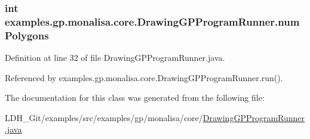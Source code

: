 \hypertarget{classexamples_1_1gp_1_1monalisa_1_1core_1_1_drawing_g_p_program_runner_ae887f8429d8bfd27c586fbb8957ddaad}{
\subsubsection[{num\-Polygons}]{\setlength{\rightskip}{0pt plus 5cm}int examples.\-gp.\-monalisa.\-core.\-Drawing\-G\-P\-Program\-Runner.\-num\-Polygons}}\label{classexamples_1_1gp_1_1monalisa_1_1core_1_1_drawing_g_p_program_runner_ae887f8429d8bfd27c586fbb8957ddaad}


Definition at line 32 of file Drawing\-G\-P\-Program\-Runner.\-java.



Referenced by examples.\-gp.\-monalisa.\-core.\-Drawing\-G\-P\-Program\-Runner.\-run().



The documentation for this class was generated from the following file\-:\begin{DoxyCompactItemize}
\item 
L\-D\-H\-\_\-\-Git/examples/src/examples/gp/monalisa/core/\hyperlink{_drawing_g_p_program_runner_8java}{Drawing\-G\-P\-Program\-Runner.\-java}\end{DoxyCompactItemize}
